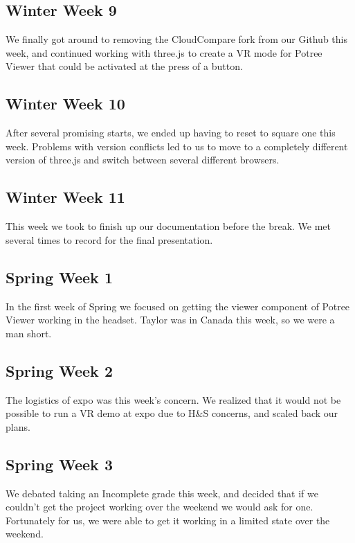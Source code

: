 \documentclass[draftclsnofoot,onecolumn]{IEEEtran}
\begin{document}
\subsection{Winter Week 9}

We finally got around to removing the CloudCompare fork from our Github this week, and continued working with three.js to create a VR mode for Potree Viewer that could be activated at the press of a button.

\subsection{Winter Week 10}

After several promising starts, we ended up having to reset to square one this week. 
Problems with version conflicts led to us to move to a completely different version of three.js and switch between several different browsers.

\subsection{Winter Week 11}

This week we took to finish up our documentation before the break. We met several times to record for the final presentation.

\subsection{Spring Week 1}

In the first week of Spring we focused on getting the viewer component of Potree Viewer working in the headset. 
Taylor was in Canada this week, so we were a man short.

\subsection{Spring Week 2}

The logistics of expo was this week’s concern. 
We realized that it would not be possible to run a VR demo at expo due to H&S concerns, and scaled back our plans.

\subsection{Spring Week 3}

We debated taking an Incomplete grade this week, and decided that if we couldn’t get the project working over the weekend we would ask for one. 
Fortunately for us, we were able to get it working in a limited state over the weekend.
\end{document}
